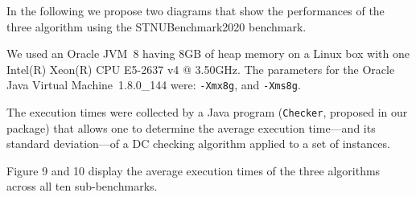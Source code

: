 \documentclass[a4paper,11pt]{article}
\begin{document}
In the following we propose two diagrams that show the performances of the three algorithm using the STNUBenchmark2020 benchmark.

We used an Oracle JVM~8 having 8GB of heap memory on a Linux box with one Intel(R) Xeon(R) CPU E5-2637 v4 @ 3.50GHz.
The parameters for the Oracle Java Virtual Machine~1.8.0\_144 were: \texttt{-Xmx8g}, and \texttt{-Xms8g}. 

The execution times were collected by a Java program (\texttt{Checker}, proposed in our package) that allows one to determine the average execution time---and its standard deviation---of a DC checking algorithm applied to a set of instances.



Figure 9 and 10 display the average execution times of the three algorithms across all ten sub-benchmarks.





\renewcommand{\yerrstd}{1.972*\thisrow{yerr}/(\thisrow{n}^.5)}%
\newcommand{\eerrstd}{1.972*\thisrow{eerr}/(\thisrow{n}^.5)}%
\newcommand{\cerrstd}{1.972*\thisrow{cerr}/(\thisrow{n}^.5)}%


\testOneMorrisDC
\end{document}
